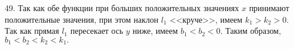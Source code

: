 49. Так как обе функции при больших положительных значениях $x$ принимают положительные значения, при этом наклон $l_1$ <<круче>>, имеем $k_1>k_2>0.$
Так как прямая $l_1$ пересекает ось $y$ ниже, имеем $b_1<b_2<0.$ Таким образом, $b_1<b_2<k_2<k_1.$\\
